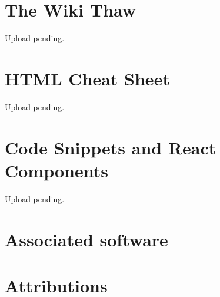 \documentclass[a4paper, 11pt, twoside]{book}
\begin{document}
\chapter{The Wiki Thaw} \label{ch:thaw}
Upload pending.
%
\newpage
%
\chapter{HTML Cheat Sheet} \label{ch:htmlcheatsheet}
Upload pending.
%
\newpage
%
\chapter{Code Snippets and React Components} \label{ch:appendix}
Upload pending.
%
\newpage

\backmatter
{}
\pagecolor{pgcolor}

\chapter{Associated software} \label{ch:associated-software}


\chapter{Attributions} \label{ch:attributions}

\end{document}
